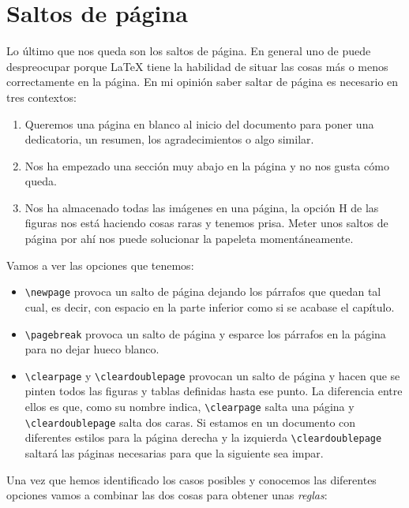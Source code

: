 \section{Saltos de página}

Lo último que nos queda son los saltos de página. En general uno de
puede despreocupar porque LaTeX tiene la habilidad de situar las cosas
más o menos correctamente en la página. En mi opinión saber saltar de
página es necesario en tres contextos:

\begin{enumerate}
\def\labelenumi{\arabic{enumi}.}
\item
  Queremos una página en blanco al inicio del documento para poner una
  dedicatoria, un resumen, los agradecimientos o algo similar.
\item
  Nos ha empezado una sección muy abajo en la página y no nos gusta cómo
  queda.
\item
  Nos ha almacenado todas las imágenes en una página, la opción H de las
  figuras nos está haciendo cosas raras y tenemos prisa. Meter unos
  saltos de página por ahí nos puede solucionar la papeleta
  momentáneamente.
\end{enumerate}

Vamos a ver las opciones que tenemos:

\begin{itemize}
\item
  \lstinline!\newpage! provoca un salto de página dejando los párrafos
  que quedan tal cual, es decir, con espacio en la parte inferior como
  si se acabase el capítulo.
\item
  \lstinline!\pagebreak! provoca un salto de página y esparce los
  párrafos en la página para no dejar hueco blanco.
\item
  \lstinline!\clearpage! y \lstinline!\cleardoublepage! provocan un
  salto de página y hacen que se pinten todos las figuras y tablas
  definidas hasta ese punto. La diferencia entre ellos es que, como su
  nombre indica, \lstinline!\clearpage! salta una página y
  \lstinline!\cleardoublepage! salta dos caras. Si estamos en un
  documento con diferentes estilos para la página derecha y la izquierda
  \lstinline!\cleardoublepage! saltará las páginas necesarias para que
  la siguiente sea impar.
\end{itemize}

Una vez que hemos identificado los casos posibles y conocemos las
diferentes opciones vamos a combinar las dos cosas para obtener unas
\emph{reglas}:

